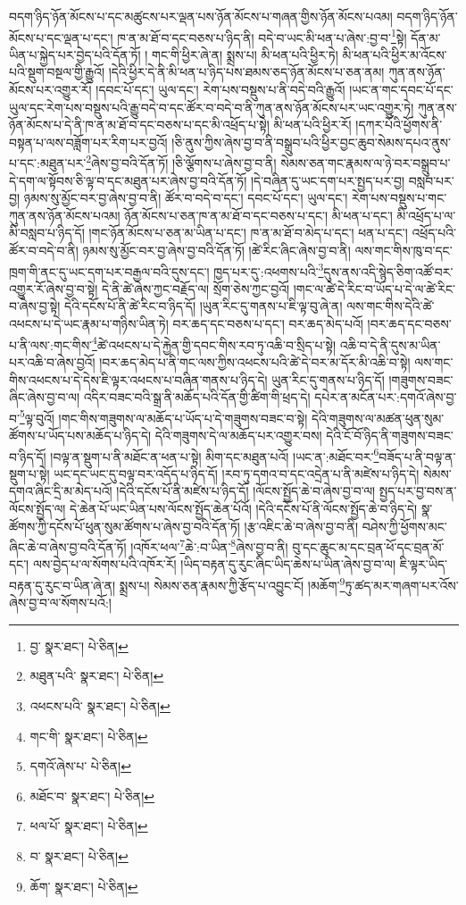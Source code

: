 བདག་ཉིད་ཉོན་མོངས་པ་དང་མཚུངས་པར་ལྡན་པས་ཉོན་མོངས་པ་གཞན་གྱིས་ཉོན་མོངས་པའམ། བདག་ཉིད་ཉོན་མོངས་པ་དང་ལྡན་པ་དང་། ཁ་ན་མ་ཐོ་བ་དང་བཅས་པ་ཉིད་ནི། བདེ་བ་ཡང་མི་ཕན་པ་ཞེས་:བྱ་བ་\footnote{བྱ་  སྣར་ཐང་།  པེ་ཅིན། }སྟེ། དོན་མ་ཡིན་པ་སྐྱེད་པར་བྱེད་པའི་དོན་ཏོ། །
གང་གི་ཕྱིར་ཞེ་ན། སྨྲས་པ། མི་ཕན་པའི་ཕྱིར་ཏེ། མི་ཕན་པའི་ཕྱིར་མ་འོངས་པའི་སྡུག་བསྔལ་གྱི་རྒྱུའོ། །དེའི་ཕྱིར་དེ་ནི་མི་ཕན་པ་ཉིད་པས་ཐམས་ཅད་ཉོན་མོངས་པ་ཅན་ནམ། ཀུན་ནས་ཉོན་མོངས་པར་འགྱུར་རོ། །དབང་པོ་དང་། ཡུལ་དང་། རེག་པས་བསྡུས་པ་ནི་བདེ་བའི་རྒྱུའོ། །ཡང་ན་གང་དབང་པོ་དང་ཡུལ་དང་རེག་པས་བསྡུས་པའི་རྒྱུ་བདེ་བ་དང་ཚོར་བ་བདེ་བ་ནི་ཀུན་ནས་ཉོན་མོངས་པར་ཡང་འགྱུར་ཏེ། ཀུན་ནས་ཉོན་མོངས་པ་དེ་ནི་ཁ་ན་མ་ཐོ་བ་དང་བཅས་པ་དང་མི་འཕྲོད་པ་སྟེ། མི་ཕན་པའི་ཕྱིར་རོ། །དཀར་པོའི་ཕྱོགས་ནི་བསྟན་པ་ལས་བཟློག་པར་རིག་པར་བྱའོ། །ཅི་ནུས་ཀྱིས་ཞེས་བྱ་བ་ནི་བསྒྲུབ་པའི་ཕྱིར་བྱང་ཆུབ་སེམས་དཔའ་ནུས་པ་དང་:མཐུན་པར་\footnote{མཐུན་པའི་  སྣར་ཐང་།  པེ་ཅིན། }ཞེས་བྱ་བའི་དོན་ཏོ། །ཅི་ལྕོགས་པ་ཞེས་བྱ་བ་ནི། སེམས་ཅན་གང་རྣམས་ལ་ཉེ་བར་བསྒྲུབ་པ་དེ་དག་ལ་སྟོབས་ཅི་ལྟ་བ་དང་མཐུན་པར་ཞེས་བྱ་བའི་དོན་ཏོ། །དེ་བཞིན་དུ་ཡང་དག་པར་སྤྱད་པར་བྱ། བསླབ་པར་བྱ། ཉམས་སུ་མྱོང་བར་བྱ་ཞེས་བྱ་བ་ནི། ཚོར་བ་བདེ་བ་དང་། དབང་པོ་དང་། ཡུལ་དང་། རེག་པས་བསྡུས་པ་གང་ཀུན་ནས་ཉོན་མོངས་པའམ། ཉོན་མོངས་པ་ཅན་ཁ་ན་མ་ཐོ་བ་དང་བཅས་པ་དང་། མི་ཕན་པ་དང་། མི་འཕྲོད་པ་ལ་མི་བསླབ་པ་ཉིད་དོ། །གང་ཉོན་མོངས་པ་ཅན་མ་ཡིན་པ་དང་། ཁ་ན་མ་ཐོ་བ་མེད་པ་དང་། ཕན་པ་དང་། འཕྲོད་པའི་ཚོར་བ་བདེ་བ་ནི། ཉམས་སུ་མྱོང་བར་བྱ་ཞེས་བྱ་བའི་དོན་ཏོ། །ཚེ་རིང་ཞིང་ཞེས་བྱ་བ་ནི། ལས་གང་གིས་ཁུ་བ་དང་ཁྲག་གི་ནང་དུ་ཡང་དག་པར་བརྒྱལ་བའི་དུས་དང་། ཁྱད་པར་དུ་:འཕགས་པའི་\footnote{འཕངས་པའི་  སྣར་ཐང་།  པེ་ཅིན། }དུས་ནས་འདི་སྙེད་ཅིག་འཚོ་བར་འགྱུར་རོ་ཞེས་བྱ་བ་སྟེ། དེ་ནི་ཚེ་ཞེས་ཀྱང་བརྗོད་ལ། སྲོག་ཅེས་ཀྱང་བྱའོ། །གང་ལ་ཚེ་དེ་རིང་བ་ཡོད་པ་དེ་ལ་ཚེ་རིང་བ་ཞེས་བྱ་སྟེ། དེའི་དངོས་པོ་ནི་ཚེ་རིང་བ་ཉིད་དོ། །ཡུན་རིང་དུ་གནས་པ་ཇི་ལྟ་བུ་ཞེ་ན། ལས་གང་གིས་དེའི་ཚེ་འཕངས་པ་དེ་ཡང་རྣམ་པ་གཉིས་ཡིན་ཏེ། བར་ཆད་དང་བཅས་པ་དང་། བར་ཆད་མེད་པའོ། །བར་ཆད་དང་བཅས་པ་ནི་ལས་:གང་གིས་\footnote{གང་གི་  སྣར་ཐང་།  པེ་ཅིན། }ཚེ་འཕངས་པ་དེ་རྐྱེན་གྱི་དབང་གིས་རབ་ཏུ་འཆི་བ་སྲིད་པ་སྟེ། འཆི་བ་དེ་ནི་དུས་མ་ཡིན་པར་འཆི་བ་ཞེས་བྱའོ། །བར་ཆད་མེད་པ་ནི་གང་ལས་ཀྱིས་འཕངས་པའི་ཚེ་དེ་བར་མ་དོར་མི་འཆི་བ་སྟེ། ལས་གང་གིས་འཕངས་པ་དེ་དེས་ཇི་ལྟར་འཕངས་པ་བཞིན་གནས་པ་ཉིད་དེ། ཡུན་རིང་དུ་གནས་པ་ཉིད་དོ། །གཟུགས་བཟང་ཞིང་ཞེས་བྱ་བ་ལ། འདིར་བཟང་བའི་སྒྲ་ནི་མཆོད་པའི་དོན་གྱི་ཚིག་གི་ཕྲད་དེ། དཔེར་ན་མངོན་པར་:དགའོ་ཞེས་བྱ་བ་\footnote{དགའོ་ཞེས་པ་  པེ་ཅིན། }ལྟ་བུའོ། །གང་གིས་གཟུགས་ལ་མཆོད་པ་ཡོད་པ་དེ་གཟུགས་བཟང་བ་སྟེ། དེའི་གཟུགས་ལ་མཚན་ཕུན་སུམ་ཚོགས་པ་ཡོད་པས་མཆོད་པ་ཉིད་དེ། དེའི་གཟུགས་དེ་ལ་མཆོད་པར་འགྱུར་བས། དེའི་ངོ་བོ་ཉིད་ནི་གཟུགས་བཟང་བ་ཉིད་དོ། །བལྟ་ན་སྡུག་པ་ནི་མཐོང་ན་ཕན་པ་སྟེ། མིག་དང་མཐུན་པའོ། །ཡང་ན་:མཐོང་བར་\footnote{མཐོང་བ་  སྣར་ཐང་།  པེ་ཅིན། }བཟོད་པ་ནི་བལྟ་ན་སྡུག་པ་སྟེ། ཡང་དང་ཡང་དུ་བལྟ་བར་འདོད་པ་ཉིད་དོ། །རབ་ཏུ་དགའ་བ་དང་འདྲེན་པ་ནི་མཛེས་པ་ཉིད་དེ། སེམས་དགའ་ཞིང་དྲི་མ་མེད་པའོ། །དེའི་དངོས་པོ་ནི་མཛེས་པ་ཉིད་དོ། །ལོངས་སྤྱོད་ཆེ་བ་ཞེས་བྱ་བ་ལ། སྤྱད་པར་བྱ་བས་ན་ལོངས་སྤྱོད་ལ། དེ་ཆེན་པོ་ཡང་ཡིན་པས་ལོངས་སྤྱོད་ཆེན་པོའོ། །དེའི་དངོས་པོ་ནི་ལོངས་སྤྱོད་ཆེ་བ་ཉིད་དེ། སྣ་ཚོགས་ཀྱི་དངོས་པོ་ཕུན་སུམ་ཚོགས་པ་ཞེས་བྱ་བའི་དོན་ཏོ། །རྩ་འཇིང་ཆེ་བ་ཞེས་བྱ་བ་ནི། བཤེས་ཀྱི་ཕྱོགས་མང་ཞིང་ཆེ་བ་ཞེས་བྱ་བའི་དོན་ཏོ། །འཁོར་ཕལ་\footnote{ཕལ་པོ་  སྣར་ཐང་།  པེ་ཅིན། }ཆེ་:བ་ཡིན་\footnote{བ་  སྣར་ཐང་།  པེ་ཅིན། }ཞེས་བྱ་བ་ནི། བུ་དང་ཆུང་མ་དང་བྲན་ཕོ་དང་བྲན་མོ་དང་། ལས་བྱེད་པ་ལ་སོགས་པའི་འཁོར་རོ། །ཡིད་བརྟན་དུ་རུང་ཞིང་ཡིད་ཆེས་པ་ཡིན་ཞེས་བྱ་བ་ལ། ཇི་ལྟར་ཡིད་བརྟན་དུ་རུང་བ་ཡིན་ཞེ་ན། སྨྲས་པ། སེམས་ཅན་རྣམས་ཀྱི་རྩོད་པ་འབྱུང་ངོ། །མཆོག་\footnote{ཆོག་  སྣར་ཐང་།  པེ་ཅིན། }ཏུ་ཚད་མར་གཞག་པར་འོས་ཞེས་བྱ་བ་ལ་སོགས་པའོ:། 